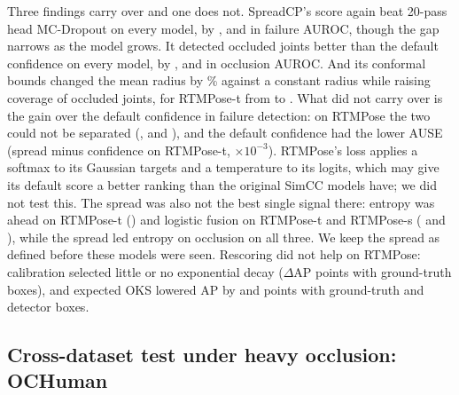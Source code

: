 \documentclass[preprint,11pt]{elsarticle}
\newcommand{\method}{SpreadCP}
\begin{document}
Three findings carry over and one does not. \method{}'s score again beat 20-pass head MC-Dropout on
every model, by \DfaZsRtmposeTDistMinusMc{}, \DfaZsRtmposeSDistMinusMc{} and \DfaZsRtmposeMDistMinusMc{}
in failure AUROC, though the gap narrows as the model grows. It detected occluded joints better than the
default confidence on every model, by \DoaZsRtmposeTDistMinusConf{}, \DoaZsRtmposeSDistMinusConf{} and
\DoaZsRtmposeMDistMinusConf{} in occlusion AUROC. And its conformal bounds changed the mean radius by
\RtmRadiusRange\% against a constant radius while raising coverage of occluded joints, for RTMPose-t from
\CovOccZsRtmposeTConstant{} to \CovOccZsRtmposeTDist{}. What did not carry over is the gain over the
default confidence in failure detection: on RTMPose the two could not be separated
(\DfaZsRtmposeTDistMinusConf{}, \DfaZsRtmposeSDistMinusConf{} and \DfaZsRtmposeMDistMinusConf{}), and the
default confidence had the lower AUSE (spread minus confidence \DauseZsRtmposeTDistMinusConf{} on
RTMPose-t, $\times10^{-3}$). RTMPose's loss applies a softmax to its Gaussian targets and a temperature
to its logits, which may give its default score a better ranking than the original SimCC models have;
we did not test this. The spread
was also not the best single signal there: entropy was ahead on RTMPose-t
(\DfaZsRtmposeTEntropyMinusDist{}) and logistic fusion on RTMPose-t and RTMPose-s
(\DfaZsRtmposeTFusionMinusDist{} and \DfaZsRtmposeSFusionMinusDist{}), while the spread led entropy on
occlusion on all three. We keep the spread as defined before these models were seen. Rescoring did not
help on RTMPose: calibration selected little or no exponential decay ($\Delta$AP \RtmRescoreExpAlphaDistGt{}
points with ground-truth boxes), and expected OKS lowered AP by \RtmRescoreEoksDistGt{} and
\RtmRescoreEoksDistDet{} points with ground-truth and detector boxes.

\begin{table}[t]
\centering\small
\caption{RTMPose with published COCO weights, no retraining. AP is on all val2017 images as a
reproduction check; uncertainty metrics are on the test split. ``Spread minus'' columns are paired
failure AUROC differences. Occluded coverage is for 90\% conformal regions with a constant radius and
with \method{}'s spread. $^\dagger$MMPose model zoo values with a different detector, not re-measured.}
\label{tab:rtmpose}
\end{table}

\subsection{Cross-dataset test under heavy occlusion: OCHuman}\label{sec:ochuman}
\end{document}
